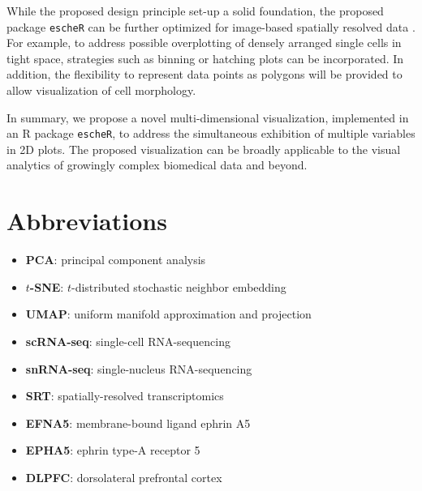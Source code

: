 \documentclass[10pt,twocolumn]{article}
\newcommand{\rr}[1]{{\color{red} #1}}
\begin{document}
While the proposed design principle set-up a solid foundation, the proposed package \texttt{escheR} can be further optimized for image-based spatially resolved data \cite{caicedo_2017}. For example, to address possible overplotting of densely arranged single cells in tight space, strategies such as binning or hatching plots \cite{patrick2023spatial} can be incorporated. In addition, the flexibility to represent data points as polygons will be provided to allow visualization of cell morphology.

In summary, we propose a novel multi-dimensional visualization, implemented in an R package \texttt{escheR}, to address the simultaneous exhibition of multiple variables in 2D plots. The proposed visualization can be broadly applicable to the visual analytics of growingly complex biomedical data and beyond.










\clearpage
\section*{Abbreviations}

\begin{itemize}[nosep]
    \item \textbf{PCA}: principal component analysis
    \item \textbf{$t$-SNE}: $t$-distributed stochastic neighbor embedding
    \item \textbf{UMAP}: uniform manifold approximation and projection
    \item \textbf{scRNA-seq}: single-cell RNA-sequencing
    \item \textbf{snRNA-seq}: single-nucleus RNA-sequencing
    \item \textbf{SRT}: spatially-resolved transcriptomics 
    \item \textbf{EFNA5}: membrane-bound ligand ephrin A5
    \item \textbf{EPHA5}: ephrin type-A receptor 5
    \item \textbf{DLPFC}: dorsolateral prefrontal cortex
\end{itemize}
\end{document}
